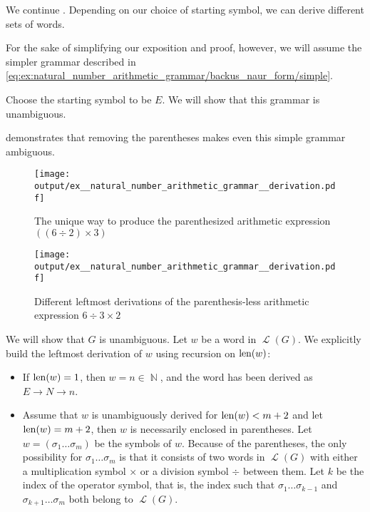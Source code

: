 \begin{example}\label{ex:natural_number_arithmetic_grammar/derivation}
  We continue . Depending on our choice of starting symbol, we can derive different sets of words.

  For the sake of simplifying our exposition and proof, however, we will assume the simpler grammar described in \eqref{eq:ex:natural_number_arithmetic_grammar/backus_naur_form/simple}.

  Choose the starting symbol to be \( E \). We will show that this grammar is unambiguous.

   demonstrates that removing the parentheses makes even this simple grammar ambiguous.

  \begin{figure}
    \hfill
    \texttt{[image: output/ex\_\_natural\_number\_arithmetic\_grammar\_\_derivation.pdf]}
    \hfill\hfill
    \caption{The unique way to produce the parenthesized arithmetic expression \( ((6 \div 2) \times 3) \)}
    \label{fig:ex:natural_number_arithmetic_grammar/derivation/unambiguous}
  \end{figure}

  \begin{figure}
    \hfill
    \texttt{[image: output/ex\_\_natural\_number\_arithmetic\_grammar\_\_derivation.pdf]}
    \hfill\hfill
    \caption{Different leftmost derivations of the parenthesis-less arithmetic expression \( 6 \div 3 \times 2 \)}
    \label{fig:ex:natural_number_arithmetic_grammar/derivation/ambiguous}
  \end{figure}

  We will show that \( G \) is unambiguous. Let \( w \) be a word in \( \mscrL(G) \). We explicitly build the leftmost derivation of \( w \) using recursion on \( \operatorname{len}(w) \):
  \begin{itemize}
    \item If \( \operatorname{len}(w) = 1 \), then \( w = n \in \BbbN \), and the word has been derived as \( E \to N \to n \).

    \item Assume that \( w \) is unambiguously derived for \( \operatorname{len}(w) < m + 2 \) and let \( \operatorname{len}(w) = m + 2 \), then \( w \) is necessarily enclosed in parentheses. Let \( w = ( \sigma_1 \ldots \sigma_m ) \) be the symbols of \( w \). Because of the parentheses, the only possibility for \( \sigma_1 \ldots \sigma_m \) is that it consists of two words in \( \mscrL(G) \) with either a multiplication symbol \( \times \) or a division symbol \( \div \) between them. Let \( k \) be the index of the operator symbol, that is, the index such that \( \sigma_1 \ldots \sigma_{k-1} \) and \( \sigma_{k+1} \ldots \sigma_m \) both belong to \( \mscrL(G) \).


\end{itemize}
\end{example}
